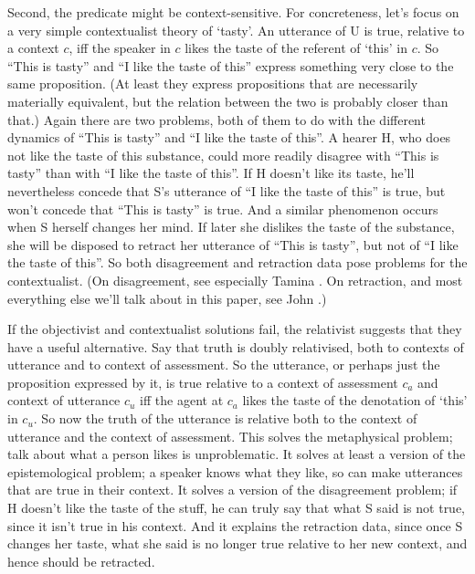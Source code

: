 Second, the predicate might be context-sensitive. For concreteness, let's focus on a very simple contextualist theory of `tasty'. An utterance of U is true, relative to a context $c$, iff the speaker in $c$ likes the taste of the referent of `this' in $c$. So ``This is tasty'' and ``I like the taste of this'' express something very close to the same proposition. (At least they express propositions that are necessarily materially equivalent, but the relation between the two is probably closer than that.) Again there are two problems, both of them to do with the different dynamics of ``This is tasty'' and ``I like the taste of this''. A hearer H, who does not like the taste of this substance, could more readily disagree with ``This is tasty'' than with ``I like the taste of this''. If H doesn't like its taste, he'll nevertheless concede that S's utterance of ``I like the taste of this'' is true, but won't concede that ``This is tasty'' is true. And a similar phenomenon occurs when S herself changes her mind. If later she dislikes the taste of the substance, she will be disposed to retract her utterance of ``This is tasty'', but not of ``I like the taste of this''. So both disagreement and retraction data pose problems for the contextualist. (On disagreement, see especially Tamina  \citet{Stephenson2007}. On retraction, and most everything else we'll talk about in this paper, see John  \citet{MacFarlane2014}.)

If the objectivist and contextualist solutions fail, the relativist suggests that they have a useful alternative. Say that truth is doubly relativised, both to contexts of utterance and to context of assessment. So the utterance, or perhaps just the proposition expressed by it, is true relative to a context of assessment $c_a$ and context of utterance $c_u$ iff the agent at $c_a$ likes the taste of the denotation of `this' in $c_u$. So now the truth of the utterance is relative both to the context of utterance and the context of assessment. This solves the metaphysical problem; talk about what a person likes is unproblematic. It solves at least a version of the epistemological problem; a speaker knows what they like, so can make utterances that are true in their context. It solves a version of the disagreement problem; if H doesn't like the taste of the stuff, he can truly say that what S said is not true, since it isn't true in his context. And it explains the retraction data, since once S changes her taste, what she said is no longer true relative to her new context, and hence should be retracted.

